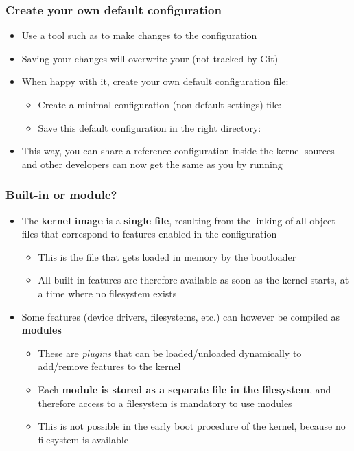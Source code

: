 \begin{frame}
  \frametitle{Create your own default configuration}
  \begin{itemize}
    \item Use a tool such as  to make changes to
      the configuration
    \item Saving your changes will overwrite your  (not
      tracked by Git)
    \item When happy with it, create your own default configuration file:
      \begin{itemize}
      \item Create a minimal configuration (non-default settings) file:\\
      \item Save this default configuration in the right directory:\\
      \end{itemize}
    \item This way, you can share a reference configuration inside
      the kernel sources and other developers can now get the same
       as you by running 
  \end{itemize}
\end{frame}

\begin{frame}
  \frametitle{Built-in or module?}
  \begin{itemize}
  \item The {\bf kernel image} is a {\bf single file}, resulting from
    the linking of all object files that correspond to features
    enabled in the configuration
    \begin{itemize}
    \item This is the file that gets loaded in memory by the
      bootloader
    \item All built-in features are therefore available as soon as the
      kernel starts, at a time where no filesystem exists
    \end{itemize}
  \item Some features (device drivers, filesystems, etc.) can however
    be compiled as {\bf modules}
    \begin{itemize}
    \item These are {\em plugins} that can be loaded/unloaded dynamically to
      add/remove features to the kernel
    \item Each {\bf module is stored as a separate file in the
        filesystem}, and therefore access to a filesystem is mandatory
      to use modules
    \item This is not possible in the early boot procedure of the
      kernel, because no filesystem is available
    \end{itemize}
  \end{itemize}
\end{frame}

